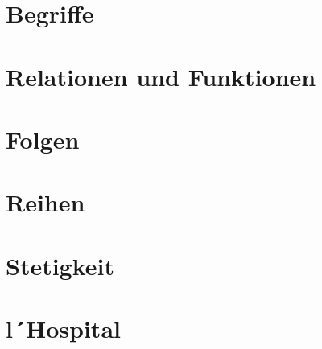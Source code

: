 \documentclass[final, 12pt]{article}
\begin{document}
  

\section{Begriffe}


\section{Relationen und Funktionen}


\section{Folgen}


\section{Reihen}


\section{Stetigkeit}


\section{l´Hospital}



\newpage
\end{document}
